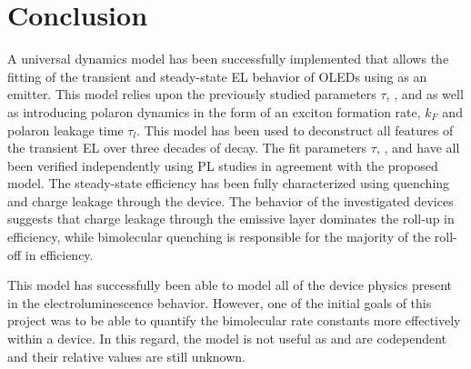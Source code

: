 \documentclass[../thesis.tex]{subfiles}
\begin{document}
\section{Conclusion}

A universal dynamics model has been successfully implemented that allows the fitting of the transient and steady-state EL behavior of OLEDs using \irppy as an emitter. 
This model relies upon the previously studied parameters $\tau$, \ktt, and \ktp as well as introducing polaron dynamics in the form of an exciton formation rate, $k_F$ and polaron leakage time $\tau_l$. 
This model has been used to deconstruct all features of the transient EL over three decades of decay. The fit parameters $\tau$, \ktt, and \ktp have all been verified independently using PL studies in agreement with the proposed model. 
The steady-state efficiency has been fully characterized using quenching and charge leakage through the device. 
The behavior of the investigated devices suggests that charge leakage through the emissive layer dominates the roll-up in efficiency, while bimolecular quenching is responsible for the majority of the roll-off in efficiency.

This model has successfully been able to model all of the device physics present in the electroluminescence behavior.  However, one of the initial goals of this project was to be able to quantify the bimolecular rate constants more effectively within a device.  In this regard, the model is not useful as \ktt and \ktp are codependent and their relative values are still unknown.  

\end{document}
